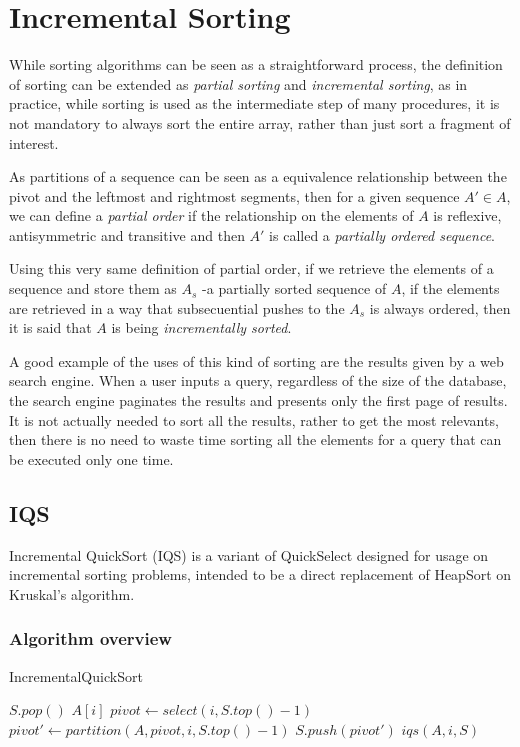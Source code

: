 \documentclass{iccmemoria}
\begin{document}
\section{Incremental Sorting}

While sorting algorithms can be seen as a straightforward process, the definition of sorting can be extended as \textit{partial sorting} and \textit{incremental sorting}, as in practice, while sorting is used as the intermediate step of many procedures, it is not mandatory to always sort the entire array, rather than just sort a fragment of interest.

As partitions of a sequence can be seen as a equivalence relationship between the pivot and the leftmost and rightmost segments\cite{10.5555/1614191}, then for a given sequence $A' \in A$, we can define a \textit{partial order} if the relationship on the elements of $A$ is reflexive, antisymmetric and transitive and then $A'$ is called a \textit{partially ordered sequence}.

Using this very same definition of partial order, if we retrieve the elements of a sequence and store them as $A_s$ -a partially sorted sequence of $A$, if the elements are retrieved in a way that subsecuential pushes to the $A_s$ is always ordered, then it is said that $A$ is being \textit{incrementally sorted}.

A good example of the uses of this kind of sorting are the results given by a web search engine. When a user inputs a query, regardless of the size of the database, the search engine paginates the results and presents only the first page of results. It is not actually needed to sort all the results, rather to get the most relevants, then there is no need to waste time sorting all the elements for a query that can be executed only one time.

\subsection{IQS}
Incremental QuickSort (IQS) \cite{Navarro_Paredes_2010} is a variant of QuickSelect designed for usage on incremental sorting problems, intended to be a direct replacement of HeapSort on Kruskal's algorithm.

\subsubsection{Algorithm overview}

\begin{algorithm}
  \caption{IncrementalQuickSort}\label{ALG:IQS}
  \begin{algorithmic}[1]
    \State $S.pop()$
    \Return $A[i]$
    \EndIf
    \State $pivot \gets select(i, S.top()-1)$
    \State $pivot' \gets partition(A,pivot,i, S.top()-1)$
    \State $S.push(pivot')$
    \State \Return $iqs(A,i,S)$
    \EndProcedure
  \end{algorithmic}
\end{algorithm}
\end{document}
